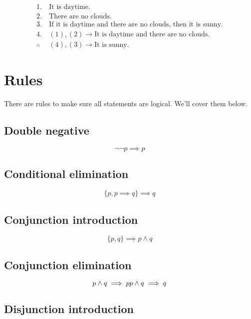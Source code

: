 \documentclass[a4paper,10pt]{report}
\begin{document}
\begin{align*}
 1.~&\text{It is daytime.} \\
 2.~&\text{There are no clouds.} \\
 3.~&\text{If it is daytime and there are no clouds, then it is sunny.} \\
 \hline
 4.~&(1), (2) \to \text{It is daytime and there are no clouds.} \\
 \hline
 \therefore~&(4), (3) \to \text{It is sunny.}
\end{align*}

\section{Rules}

There are rules to make sure all statements are logical. We'll cover them below.

\subsection{Double negative}
\begin{equation*}
 \lnot\lnot p \implies p
\end{equation*}

\subsection{Conditional elimination}
\begin{equation*}
 \{p, p \implies q\} \implies q
\end{equation*}

\subsection{Conjunction introduction}

\begin{equation*}
 \{p, q\} \implies p \land q
\end{equation*}

\subsection{Conjunction elimination}

\begin{equation*}
 p \land q \implies p \\
 p \land q \implies q
\end{equation*}

\subsection{Disjunction introduction}
\end{document}
